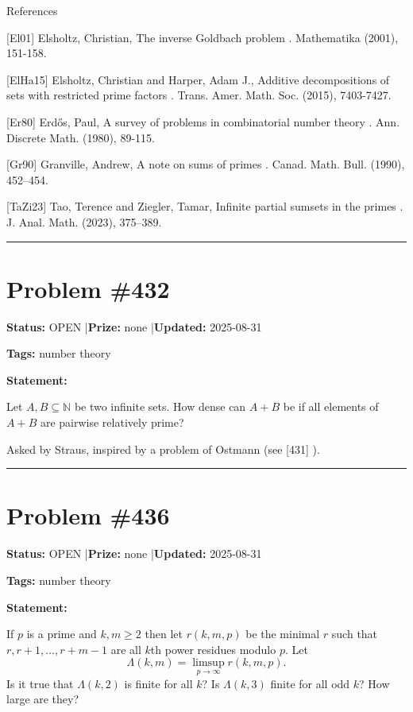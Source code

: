 \documentclass{article}
\begin{document}
References

[El01] Elsholtz, Christian, The inverse Goldbach problem . Mathematika (2001), 151-158.

[ElHa15] Elsholtz, Christian and Harper, Adam J., Additive decompositions of sets with restricted prime factors . Trans. Amer. Math. Soc. (2015), 7403-7427.

[Er80] Erd\H{o}s, Paul, A survey of problems in combinatorial number theory . Ann. Discrete Math. (1980), 89-115.

[Gr90] Granville, Andrew, A note on sums of primes . Canad. Math. Bull. (1990), 452--454.

[TaZi23] Tao, Terence and Ziegler, Tamar, Infinite partial sumsets in the primes . J. Anal. Math. (2023), 375--389.

\noindent\rule{\linewidth}{0.4pt}


\section{Problem \#432}
\label{prob:432}

\noindent\textbf{Status:} OPEN \quad|\quad \textbf{Prize:} none \quad|\quad \textbf{Updated:} 2025-08-31

\noindent\textbf{Tags:} number theory

\medskip

\noindent\textbf{Statement:}

Let $A,B\subseteq \mathbb{N}$ be two infinite sets. How dense can $A+B$ be if all elements of $A+B$ are pairwise relatively prime?




Asked by Straus, inspired by a problem of Ostmann (see [431] ).

\noindent\rule{\linewidth}{0.4pt}


\section{Problem \#436}
\label{prob:436}

\noindent\textbf{Status:} OPEN \quad|\quad \textbf{Prize:} none \quad|\quad \textbf{Updated:} 2025-08-31

\noindent\textbf{Tags:} number theory

\medskip

\noindent\textbf{Statement:}

If $p$ is a prime and $k,m\geq 2$ then let $r(k,m,p)$ be the minimal $r$ such that $r,r+1,\ldots,r+m-1$ are all $k$th power residues modulo $p$. Let\[\Lambda(k,m)=\limsup_{p\to \infty} r(k,m,p).\]Is it true that $\Lambda(k,2)$ is finite for all $k$? Is $\Lambda(k,3)$ finite for all odd $k$? How large are they?
\end{document}
